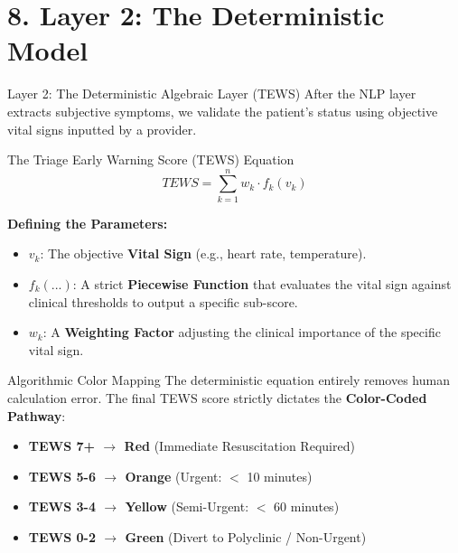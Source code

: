 \documentclass[aspectratio=169]{beamer}
\begin{document}
	\section{8. Layer 2: The Deterministic Model}
	
	\begin{frame}{Layer 2: The Deterministic Algebraic Layer (TEWS)}
		After the NLP layer extracts subjective symptoms, we validate the patient's status using objective vital signs inputted by a provider.
		
		\begin{block}{The Triage Early Warning Score (TEWS) Equation}
			$$TEWS=\sum_{k=1}^{n}w_{k}\cdot f_{k}(v_{k})$$
		\end{block}
		
		\textbf{Defining the Parameters:}
		\begin{itemize}
			\item $v_k$: The objective \textbf{Vital Sign} (e.g., heart rate, temperature).
			\item $f_k(...)$: A strict \textbf{Piecewise Function} that evaluates the vital sign against clinical thresholds to output a specific sub-score.
			\item $w_k$: A \textbf{Weighting Factor} adjusting the clinical importance of the specific vital sign.
		\end{itemize}
	\end{frame}
	
	\begin{frame}{Algorithmic Color Mapping}
		The deterministic equation entirely removes human calculation error. The final TEWS score strictly dictates the \textbf{Color-Coded Pathway}:
		\vspace{0.3cm}
		\begin{itemize}
			\item \textbf{TEWS 7+ $\rightarrow$ Red} (Immediate Resuscitation Required)
			\item \textbf{TEWS 5-6 $\rightarrow$ Orange} (Urgent: $<$ 10 minutes)
			\item \textbf{TEWS 3-4 $\rightarrow$ Yellow} (Semi-Urgent: $<$ 60 minutes)
			\item \textbf{TEWS 0-2 $\rightarrow$ Green} (Divert to Polyclinic / Non-Urgent)
		\end{itemize}
	\end{frame}
	
\end{document}
